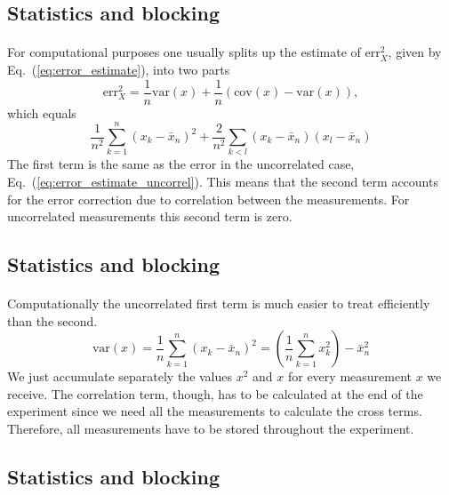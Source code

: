 \documentclass[%
twoside,                 %
final,                   %
10pt]{article}
\begin{document}
\subsection{Statistics and blocking}

\paragraph{}
For computational purposes one usually splits up the estimate of
$\mathrm{err}_X^2$, given by Eq.~(\ref{eq:error_estimate}), into two
parts
\[
\mathrm{err}_X^2 = \frac{1}{n}\mathrm{var}(x) + \frac{1}{n}(\mathrm{cov}(x)-\mathrm{var}(x)),
\]
which equals
\begin{equation}
\frac{1}{n^2}\sum_{k=1}^n (x_k - \bar x_n)^2 +\frac{2}{n^2}\sum_{k<l} (x_k - \bar x_n)(x_l - \bar x_n)
\label{eq:error_estimate_split_up}
\end{equation}
The first term is the same as the error in the uncorrelated case,
Eq.~(\ref{eq:error_estimate_uncorrel}). This means that the second
term accounts for the error correction due to correlation between the
measurements. For uncorrelated measurements this second term is zero.



\subsection{Statistics and blocking}

\paragraph{}
Computationally the uncorrelated first term is much easier to treat
efficiently than the second.
\[
\mathrm{var}(x) = \frac{1}{n}\sum_{k=1}^n (x_k - \bar x_n)^2 =
\left(\frac{1}{n}\sum_{k=1}^n x_k^2\right) - \bar x_n^2
\]
We just accumulate separately the values $x^2$ and $x$ for every
measurement $x$ we receive. The correlation term, though, has to be
calculated at the end of the experiment since we need all the
measurements to calculate the cross terms. Therefore, all measurements
have to be stored throughout the experiment.






\subsection{Statistics and blocking}
\end{document}
